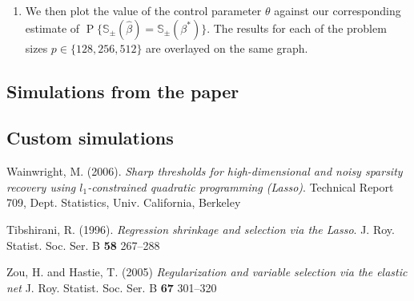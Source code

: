 \documentclass[letterpaper,12pt]{article}
\DeclareMathOperator{\prob}{P}
\begin{document}
\begin{enumerate}
\item We then plot the value of the control parameter $\theta$ against
  our corresponding estimate of
  $\prob\{\mathbb{S}_\pm(\hat{\beta}) =
  \mathbb{S}_\pm(\beta^\ast)\}$. The results for each of the problem
  sizes $p \in \{128, 256, 512\}$ are overlayed on the same graph.
\end{enumerate}

\subsection*{Simulations from the paper}

\subsection*{Custom simulations}

\begin{thebibliography}{9}
  Wainwright, M. (2006).
  \textit{Sharp thresholds for high-dimensional and noisy sparsity
    recovery using $l_1$-constrained quadratic programming (Lasso)}.
  Technical Report 709, Dept. Statistics, Univ. California,
  Berkeley

  Tibshirani, R. (1996).
  \textit{Regression shrinkage and selection via the Lasso}.
  J. Roy. Statist. Soc. Ser. B \textbf{58} 267--288

  Zou, H. and Hastie, T. (2005)
  \textit{Regularization and variable selection via the elastic net}
  J. Roy. Statist. Soc. Ser. B \textbf{67} 301--320

\end{thebibliography}
\end{document}
